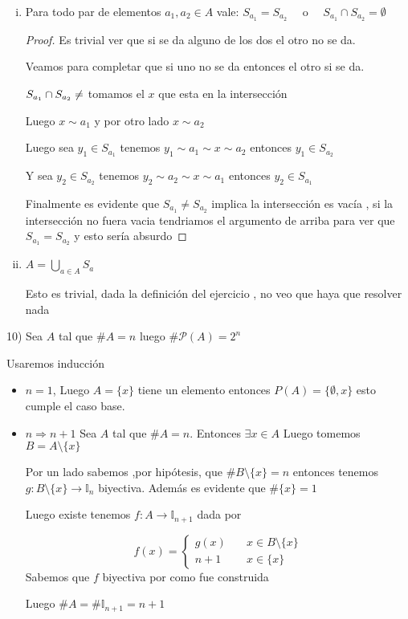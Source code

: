 \documentclass[12pt]{article}
\newcommand{\I}{\mathbb{I}}
\newcommand{\Ra}{\Rightarrow}
\newcommand{\ra}{\rightarrow}
\theoremstyle{definition}
\begin{document}
\begin{enumerate}[i.]
  \item Para todo par de elementos $a_{1}, a_{2} \in A$ vale: $S_{a_{1}} = S_{a_{2}} \quad$ o $\quad S_{a_{1}} \cap S_{a_{2}} = \emptyset$
    \begin{proof}
      Es trivial ver que si se da alguno de los dos el otro no se da.

      Veamos para completar que si uno no se da entonces el otro si se da.

      $S_{a_{1}} \cap S_{a_{2}} \neq \empty$ tomamos el $x$ que esta en la intersección

      Luego $x \sim a_{1}$ y por otro lado $x \sim a_{2}$

      Luego sea $y_{1} \in S_{a_{1}} $ tenemos $y_{1} \sim a_{1} \sim x \sim a_{2}$ entonces $y_{1} \in S_{a_{2}}$ 

      Y sea $y_{2} \in S_{a_{2}}$ tenemos $y_{2} \sim a_{2} \sim x \sim a_{1}$ entonces $y_{2} \in S_{a_{1}}$

      Finalmente es evidente que $S_{a_{1}} \neq S_{a_{2}}$ implica la intersección es vacía , si la intersección no fuera vacia tendriamos el argumento de arriba para ver que $S_{a_{1}} = S_{a_{2}}$ y esto sería absurdo
    \end{proof}

  \item $A = \bigcup_{a \in A} S_{a}$ 

    Esto es trivial, dada la definición del ejercicio , no veo que haya que resolver nada



\end{enumerate}

10) Sea $A$ tal que $\# A = n$ luego $\# \mathcal{P}(A) = 2^{n}$

Usaremos inducción

\begin{itemize}
  \item $n=1$, Luego $A = \{x\}$ tiene un elemento entonces $P(A) = \{ \emptyset , x \}$ esto cumple el caso base.

  \item $n \Ra n+1$ Sea $A$ tal que $\# A = n$. Entonces $\exists x \in A$ Luego tomemos $B = A \setminus \{x\}$

    Por un lado sabemos ,por hipótesis, que $\# B \setminus \{x\} = n$ entonces tenemos $g: B \setminus \{x\} \ra \I_{n}$ biyectiva. Además es evidente que $\# \{x\} = 1$ 

    Luego existe tenemos $f: A \ra \I_{n+1}$ dada por 

$$
f(x) = \left\{
        \begin{array}{ll}
	  g(x) & \quad x \in B \setminus \{x\} \\
           n+1 & \quad x \in \{x\} 
        \end{array}
    \right.
$$
Sabemos que $f$ biyectiva por como fue construida

Luego $\# A = \# \I_{n + 1} =  n + 1$
  \end{itemize}
\end{document}
